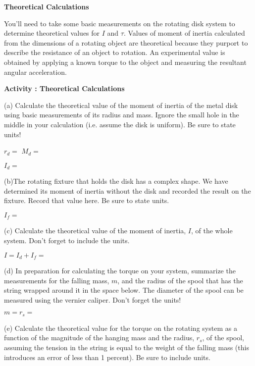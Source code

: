 \textbf{Theoretical Calculations} 

You'll need to take some basic measurements on the rotating disk system
to determine theoretical values for $I$ and \( \tau  \). Values of moment of
inertia calculated from the dimensions of a rotating object are theoretical
because they purport to describe the resistance of an object to rotation. An
experimental value is obtained by applying a known torque to the object and
measuring the resultant angular acceleration.

\newpage

\textbf{Activity  : Theoretical Calculations }

(a) Calculate the theoretical value of the moment of inertia of the metal disk
using basic measurements of its radius and mass. Ignore the small hole in the
middle in your calculation (i.e. assume the disk is uniform). Be sure to state units!
\vspace{5mm}

\( r_{d} =\) \hfill{}\( M_{d}= \) \hfill{}
\vspace{5mm}

\( I_{d}= \) 
\vspace{5mm}

(b)The rotating fixture that holds the disk has a complex shape. We have determined
its moment of inertia without the disk and recorded the result on the fixture.
Record that value here. Be sure to state units.
\vspace{5mm}

\( I_{f} =\) 
\vspace{5mm}

(c) Calculate the theoretical value of the moment of inertia, $I$, of the whole
system. Don't forget to include the units.
\vspace{5mm}

$I = I_{d} + I_{f} =$
\vspace{5mm}

(d) In preparation for calculating the torque on your system, summarize the
measurements for the falling mass, $m$, and the radius of the spool that has the 
string wrapped around it in the space below. The diameter of the spool can be 
measured using the vernier caliper. Don't forget the units!
\vspace{5mm}

$m = $\hfill{}\(r_{s}= \)\hfill{} 
\vspace{5mm}

(e) Calculate the theoretical value for the torque on the rotating system as
a function of the magnitude of the hanging mass and the radius, \( r_{s} \),
of the spool, assuming the tension in the string is equal to the weight of the 
falling mass (this introduces an error of less than 1 percent).  Be sure to include units.
\vspace{5mm}

